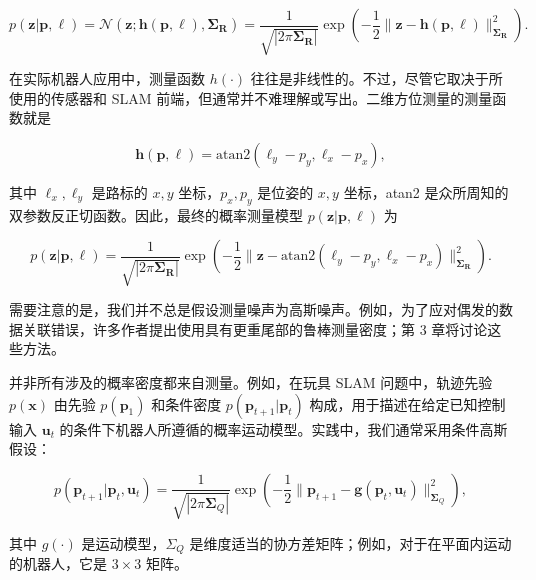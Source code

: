 \begin{equation}
p (\boldsymbol {z} | \boldsymbol {p}, \ell) = \mathcal {N} (\boldsymbol {z}; \boldsymbol {h} (\boldsymbol {p}, \ell), \boldsymbol {\Sigma} _ {\boldsymbol {R}}) = \frac {1}{\sqrt {| 2 \pi \boldsymbol {\Sigma} _ {\boldsymbol {R}} |}} \exp \left(- \frac {1}{2} \| \boldsymbol {z} - \boldsymbol {h} (\boldsymbol {p}, \ell) \| _ {\boldsymbol {\Sigma} _ {\boldsymbol {R}}} ^ {2}\right).\tag{1.12}
\end{equation}

在实际机器人应用中，测量函数 $h(\cdot)$ 往往是非线性的。不过，尽管它取决于所使用的传感器和 SLAM 前端，但通常并不难理解或写出。二维方位测量的测量函数就是

\begin{equation}
\pmb {h} (\pmb {p}, \ell) = \mathrm{atan2} (\ell_ {y} - p _ {y}, \ell_ {x} - p _ {x}),\tag{1.13}
\end{equation}

其中 $\ell_x,\ell_y$ 是路标的 $x,y$ 坐标，$p_x,p_y$ 是位姿的 $x,y$ 坐标，atan2 是众所周知的双参数反正切函数。因此，最终的概率测量模型 $p(\boldsymbol z|\boldsymbol p,\boldsymbol\ell)$ 为

\begin{equation}
p (\pmb {z} | \pmb {p}, \pmb {\ell}) = \frac {1}{\sqrt {| 2 \pi \pmb {\Sigma} _ {\pmb {R}} |}} \exp \left(- \frac {1}{2} \| \pmb {z} - \mathrm{atan2} (\ell_ {y} - p _ {y}, \ell_ {x} - p _ {x}) \| _ {\pmb {\Sigma} _ {\pmb {R}}} ^ {2}\right).\tag{1.14}
\end{equation}

需要注意的是，我们并不总是假设测量噪声为高斯噪声。例如，为了应对偶发的数据关联错误，许多作者提出使用具有更重尾部的鲁棒测量密度；第 3 章将讨论这些方法。

并非所有涉及的概率密度都来自测量。例如，在玩具 SLAM 问题中，轨迹先验 $p(\pmb x)$ 由先验 $p(\pmb p_1)$ 和条件密度 $p(\pmb p_{t+1}|\pmb p_t)$ 构成，用于描述在给定已知控制输入 $\pmb u_t$ 的条件下机器人所遵循的概率运动模型。实践中，我们通常采用条件高斯假设：

\begin{equation}
p (\pmb {p} _ {t + 1} | \pmb {p} _ {t}, \pmb {u} _ {t}) = \frac {1}{\sqrt {| 2 \pi \pmb {\Sigma} _ {Q} |}} \exp \left(- \frac {1}{2} \| \pmb {p} _ {t + 1} - \pmb {g} (\pmb {p} _ {t}, \pmb {u} _ {t}) \| _ {\pmb {\Sigma} _ {Q}} ^ {2}\right),\tag{1.15}
\end{equation}

其中 $g(\cdot)$ 是运动模型，$\Sigma_Q$ 是维度适当的协方差矩阵；例如，对于在平面内运动的机器人，它是 $3\times3$ 矩阵。

